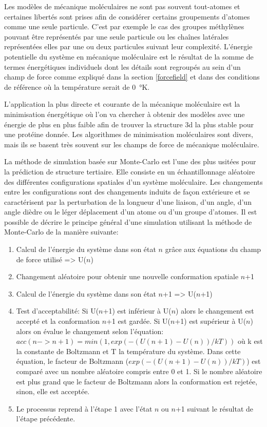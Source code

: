 Les modèles de mécanique moléculaires ne sont pas souvent tout-atomes et certaines libertés sont prises afin de considérer certains groupements d'atomes comme une seule particule. C'est par exemple le cas des groupes méthylènes pouvant être représentés par une seule particule ou les chaînes latérales représentées elles par une ou deux particules suivant leur complexité. L'énergie potentielle du système en mécanique moléculaire est le résultat de la somme de termes énergétiques individuels dont les détails sont regroupés au sein d'un champ de force comme expliqué dans la section \ref{forcefield} et dans des conditions de référence où la température serait de \SI{0}{\degree}K.

L'application la plus directe et courante de la mécanique moléculaire est la minimisation énergétique où l'on va chercher à obtenir des modèles avec une énergie de plus en plus faible afin de trouver la structure 3d la plus stable pour une protéine donnée. Les algorithmes de minimisation moléculaires sont divers, mais ils se basent très souvent sur les champs de force de mécanique moléculaire.



La méthode de simulation basée sur Monte-Carlo est l'une des plus usitées \cite{metropolis1949monte} pour la prédiction de structure tertiaire. Elle consiste en un échantillonnage aléatoire des différentes configurations spatiales d'un système moléculaire. Les changements entre les configurations sont des changements induits de façon extérieure et se caractérisent par la perturbation de la longueur d'une liaison, d'un angle, d'un angle dièdre ou le léger déplacement d'un atome ou d'un groupe d'atomes. Il est possible de décrire le principe général d'une simulation utilisant la méthode de Monte-Carlo de la manière suivante:

\begin{enumerate}
	\item Calcul de l'énergie du système dans son état $n$ grâce aux équations du champ de force utilisé => U($n$)
	\item Changement aléatoire pour obtenir une nouvelle conformation spatiale $n$+1
	\item Calcul de l'énergie du système dans son état $n$+1 => U($n$+1)
	\item Test d'acceptabilité: 
	Si U($n$+1) est inférieur à U($n$) alors le changement est accepté et la conformation $n$+1 est gardée. 
	Si U($n$+1) est supérieur à U($n$) alors on évalue le changement selon l'équation: $acc(n -> n+1) = min(1, exp(-(U(n+1)-U(n))/kT))$ où k est la constante de Boltzmann et T la température du système. Dans cette équation, le facteur de Boltzmann ($exp(-(U(n+1)-U(n))/kT)$) est comparé avec un nombre aléatoire compris entre 0 et 1. Si le nombre aléatoire est plus grand que le facteur de Boltzmann alors la conformation est rejetée, sinon, elle est acceptée.
	\item Le processus reprend à l'étape 1 avec l'état $n$ ou $n$+1 suivant le résultat de l'étape précédente.
\end{enumerate}

